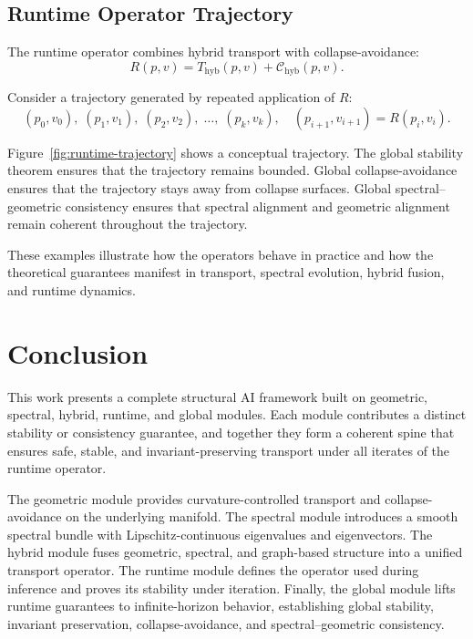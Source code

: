 \documentclass[11pt]{article}
\begin{document}
\subsection{Runtime Operator Trajectory}

The runtime operator combines hybrid transport with collapse-avoidance:
\[
R(p,v) = T_{\mathrm{hyb}}(p,v) + \mathcal{C}_{\mathrm{hyb}}(p,v).
\]

Consider a trajectory generated by repeated application of $R$:
\[
(p_0,v_0),\;
(p_1,v_1),\;
(p_2,v_2),\;
\ldots,\;
(p_k,v_k),
\quad
(p_{i+1},v_{i+1}) = R(p_i,v_i).
\]

Figure~\ref{fig:runtime-trajectory} shows a conceptual trajectory. The
global stability theorem ensures that the trajectory remains bounded.
Global collapse-avoidance ensures that the trajectory stays away from
collapse surfaces. Global spectral--geometric consistency ensures that
spectral alignment and geometric alignment remain coherent throughout the
trajectory.

These examples illustrate how the operators behave in practice and how
the theoretical guarantees manifest in transport, spectral evolution,
hybrid fusion, and runtime dynamics.

\section{Conclusion}

This work presents a complete structural AI framework built on geometric,
spectral, hybrid, runtime, and global modules. Each module contributes a
distinct stability or consistency guarantee, and together they form a
coherent spine that ensures safe, stable, and invariant-preserving
transport under all iterates of the runtime operator.

The geometric module provides curvature-controlled transport and
collapse-avoidance on the underlying manifold. The spectral module
introduces a smooth spectral bundle with Lipschitz-continuous eigenvalues
and eigenvectors. The hybrid module fuses geometric, spectral, and
graph-based structure into a unified transport operator. The runtime
module defines the operator used during inference and proves its
stability under iteration. Finally, the global module lifts runtime
guarantees to infinite-horizon behavior, establishing global stability,
invariant preservation, collapse-avoidance, and spectral--geometric
consistency.
\end{document}
